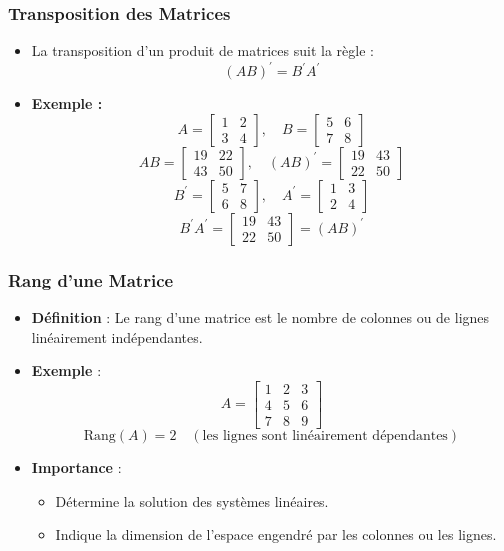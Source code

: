 \documentclass{beamer}
\begin{document}
\begin{frame}
  \frametitle{Transposition des Matrices}
  \begin{itemize}
    \item La transposition d'un produit de matrices suit la règle :
    \[
    (AB)^{\prime} = B^{\prime} A^{\prime}
    \]
    \item \textbf{Exemple :}
    \[
    A = \begin{bmatrix} 
    1 & 2 \\ 
    3 & 4 
    \end{bmatrix}, \quad
    B = \begin{bmatrix} 
    5 & 6 \\ 
    7 & 8 
    \end{bmatrix}
    \]
    \[
    AB = \begin{bmatrix} 
    19 & 22 \\ 
    43 & 50 
    \end{bmatrix}, \quad
    (AB)^{\prime} = \begin{bmatrix} 
    19 & 43 \\ 
    22 & 50 
    \end{bmatrix}
    \]
    \[
    B^{\prime} = \begin{bmatrix} 
    5 & 7 \\ 
    6 & 8 
    \end{bmatrix}, \quad
    A^{\prime} = \begin{bmatrix} 
    1 & 3 \\ 
    2 & 4 
    \end{bmatrix}
    \]
    \[
    B^{\prime}A^{\prime} = \begin{bmatrix} 
    19 & 43 \\ 
    22 & 50 
    \end{bmatrix} = (AB)^{\prime}
    \]
  \end{itemize}
\end{frame}

\begin{frame}
  \frametitle{Rang d'une Matrice}
  \begin{itemize}
    \item \textbf{Définition} : Le rang d'une matrice est le nombre de colonnes ou de lignes linéairement indépendantes.
    \item \textbf{Exemple} :
      \[
      A = \begin{bmatrix} 
      1 & 2 & 3 \\ 
      4 & 5 & 6 \\ 
      7 & 8 & 9 
      \end{bmatrix}
      \]
      \[
      \text{Rang}(A) = 2 \quad (\text{les lignes sont linéairement dépendantes})
      \]
    \item \textbf{Importance} :
      \begin{itemize}
        \item Détermine la solution des systèmes linéaires.
        \item Indique la dimension de l'espace engendré par les colonnes ou les lignes.
      \end{itemize}
  \end{itemize}
\end{frame}
\end{document}
